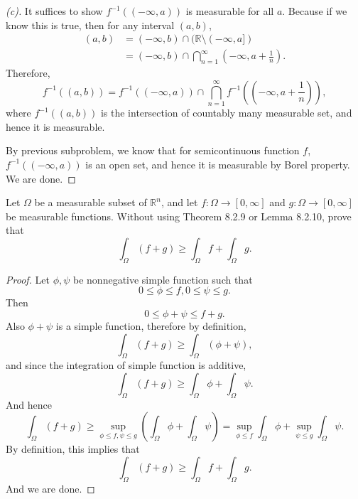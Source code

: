 \begin{proof}[(c)]
    It suffices to show $f^{-1}((-\infty, a))$ is measurable for all $a$. Because if we know this is true, then for any interval $(a,b)$, 
    \[
        \begin{aligned}
            (a, b) &= (-\infty, b) \cap (\mathbb{R} \setminus (-\infty, a]) \\
            &= (-\infty, b) \cap \bigcap_{n=1}^{\infty} (-\infty, a + \frac{1}{n}).
        \end{aligned}
    \]
    Therefore, 
    \[
        f^{-1}((a,b)) = f^{-1}((-\infty, a)) \cap \bigcap_{n=1}^{\infty} f^{-1}((-\infty, a + \frac{1}{n})),
    \]
    where $f^{-1}((a,b))$ is the intersection of countably many measurable set, and hence it is measurable.


    By previous subproblem, we know that for semicontinuous function $f$, $f^{-1}((-\infty, a))$ is an open set, and hence it is measurable by Borel property. We are done.
\end{proof}

\begin{problem}
    Let $\Omega$ be a measurable subset of $\mathbb{R}^n$, and let $f:\Omega\to[0,\infty]$ and $g:\Omega\to[0,\infty]$ be measurable functions.
    Without using Theorem 8.2.9 or Lemma 8.2.10, prove that
    $$
    \int_\Omega (f+g)\ge \int_\Omega f + \int_\Omega g.
    $$
\end{problem}

\begin{proof}
    Let $\phi, \psi$ be nonnegative simple function such that
    \[
        0 \le \phi \le f, 0 \le \psi \le g.
    \]
    Then 
    \[
        0 \le \phi + \psi \le f + g.
    \]
    Also $\phi + \psi$ is a simple function, therefore by definition,
    \[
        \int_\Omega (f+g) \ge \int_\Omega (\phi + \psi),
    \]
    and since the integration of simple function is additive,
    \[
        \int_\Omega (f+g) \ge \int_\Omega \phi + \int_\Omega \psi.
    \]
    And hence
    \[
        \int_\Omega (f+g) \ge \sup_{\phi \le f, \psi \le g} (\int_\Omega \phi + \int_\Omega \psi) = \sup_{\phi \le f} \int_\Omega \phi + \sup_{\psi \le g} \int_\Omega \psi.
    \]
    By definition, this implies that
    \[
        \int_\Omega (f+g) \ge \int_\Omega f + \int_\Omega g.
    \]
    And we are done.
\end{proof}

